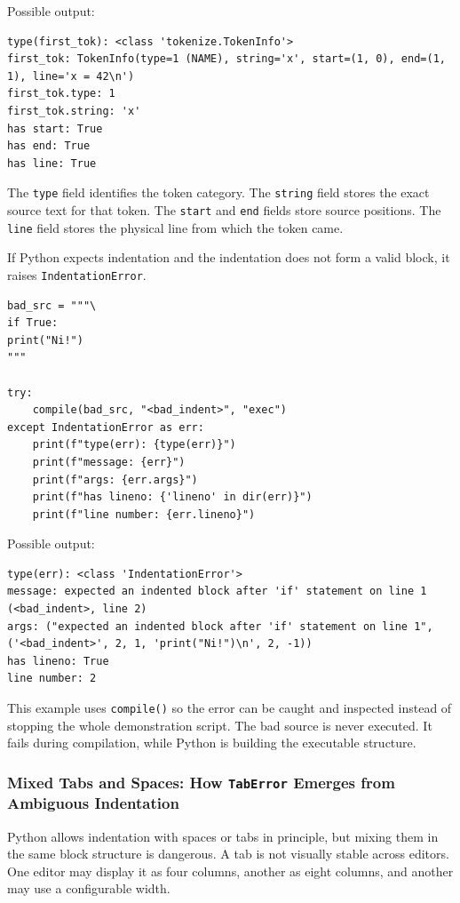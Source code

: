 Possible output:

\begin{verbatim}
type(first_tok): <class 'tokenize.TokenInfo'>
first_tok: TokenInfo(type=1 (NAME), string='x', start=(1, 0), end=(1, 1), line='x = 42\n')
first_tok.type: 1
first_tok.string: 'x'
has start: True
has end: True
has line: True
\end{verbatim}

The \texttt{type} field identifies the token category. The \texttt{string} field stores the exact source text for that token. The \texttt{start} and \texttt{end} fields store source positions. The \texttt{line} field stores the physical line from which the token came.

If Python expects indentation and the indentation does not form a valid block, it raises \texttt{IndentationError}.

\begin{verbatim}
bad_src = """\
if True:
print("Ni!")
"""

try:
    compile(bad_src, "<bad_indent>", "exec")
except IndentationError as err:
    print(f"type(err): {type(err)}")
    print(f"message: {err}")
    print(f"args: {err.args}")
    print(f"has lineno: {'lineno' in dir(err)}")
    print(f"line number: {err.lineno}")
\end{verbatim}

Possible output:

\begin{verbatim}
type(err): <class 'IndentationError'>
message: expected an indented block after 'if' statement on line 1 (<bad_indent>, line 2)
args: ("expected an indented block after 'if' statement on line 1", ('<bad_indent>', 2, 1, 'print("Ni!")\n', 2, -1))
has lineno: True
line number: 2
\end{verbatim}

This example uses \texttt{compile()} so the error can be caught and inspected instead of stopping the whole demonstration script. The bad source is never executed. It fails during compilation, while Python is building the executable structure.

\subsubsection{Mixed Tabs and Spaces: How \texttt{TabError} Emerges from Ambiguous Indentation}

Python allows indentation with spaces or tabs in principle, but mixing them in the same block structure is dangerous. A tab is not visually stable across editors. One editor may display it as four columns, another as eight columns, and another may use a configurable width.

